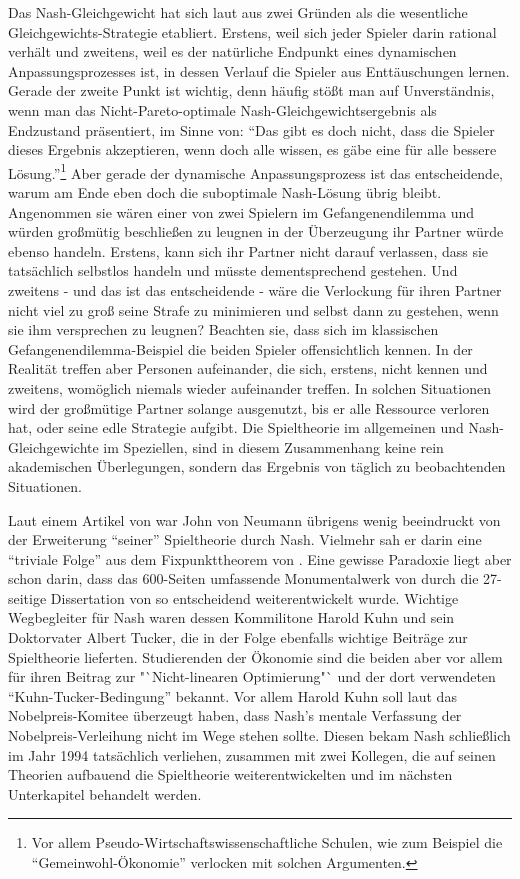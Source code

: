 Das Nash-Gleichgewicht hat sich laut \textcite[S. 61]{Holler2005} aus zwei Gründen als die wesentliche Gleichgewichts-Strategie etabliert. Erstens, weil sich jeder Spieler darin rational verhält und zweitens, weil es der natürliche Endpunkt eines dynamischen Anpassungsprozesses ist, in dessen Verlauf die Spieler aus Enttäuschungen lernen. Gerade der zweite Punkt ist wichtig, denn häufig stößt man auf Unverständnis, wenn man das Nicht-Pareto-optimale Nash-Gleichgewichtsergebnis als Endzustand präsentiert, im Sinne von: "`Das gibt es doch nicht, dass die Spieler dieses Ergebnis akzeptieren, wenn doch alle wissen, es gäbe eine für alle bessere Lösung."'\footnote{Vor allem Pseudo-Wirtschaftswissenschaftliche Schulen, wie zum Beispiel die "`Gemeinwohl-Ökonomie"' verlocken mit solchen Argumenten.} Aber gerade der dynamische Anpassungsprozess ist das entscheidende, warum am Ende eben doch die suboptimale Nash-Lösung übrig bleibt. Angenommen sie wären einer von zwei Spielern im Gefangenendilemma und würden großmütig beschließen zu leugnen in der Überzeugung ihr Partner würde ebenso handeln. Erstens, kann sich ihr Partner nicht darauf verlassen, dass sie tatsächlich selbstlos handeln und müsste dementsprechend gestehen. Und zweitens - und das ist das entscheidende - wäre die Verlockung für ihren Partner nicht viel zu groß seine Strafe zu minimieren und selbst dann zu gestehen, wenn sie ihm versprechen zu leugnen? Beachten sie, dass sich im klassischen Gefangenendilemma-Beispiel die beiden Spieler offensichtlich kennen. In der Realität treffen aber Personen aufeinander, die sich, erstens, nicht kennen und zweitens, womöglich niemals wieder aufeinander treffen. In solchen Situationen wird der großmütige Partner solange ausgenutzt, bis er alle Ressource verloren hat, oder seine edle Strategie aufgibt. Die Spieltheorie im allgemeinen und Nash-Gleichgewichte im Speziellen, sind in diesem Zusammenhang keine rein akademischen Überlegungen, sondern das Ergebnis von täglich zu beobachtenden Situationen.

Laut einem Artikel von \textcite{Cassidy2015} war John von Neumann übrigens wenig beeindruckt von der Erweiterung "`seiner"' Spieltheorie durch Nash. Vielmehr sah er darin eine "`triviale Folge"' aus dem Fixpunkttheorem von \textcite{Brouwer1912}. Eine gewisse Paradoxie liegt aber schon darin, dass das 600-Seiten umfassende Monumentalwerk von \textcite{VonNeumann1944} durch die 27-seitige Dissertation von \textcite{Nash1950} so entscheidend weiterentwickelt wurde. Wichtige Wegbegleiter für Nash waren dessen Kommilitone Harold Kuhn und sein Doktorvater Albert Tucker, die in der Folge ebenfalls wichtige Beiträge zur Spieltheorie lieferten. Studierenden der Ökonomie sind die beiden aber vor allem für ihren Beitrag zur "`Nicht-linearen Optimierung"` und der dort verwendeten "`Kuhn-Tucker-Bedingung"' \parencite{Kuhn1951} bekannt. Vor allem Harold Kuhn soll laut \textcite{Rubinstein2003} das Nobelpreis-Komitee überzeugt haben, dass Nash's mentale Verfassung der Nobelpreis-Verleihung nicht im Wege stehen sollte. Diesen bekam Nash schließlich im Jahr 1994 tatsächlich verliehen, zusammen mit zwei Kollegen, die auf seinen Theorien aufbauend die Spieltheorie weiterentwickelten und im nächsten Unterkapitel behandelt werden.


